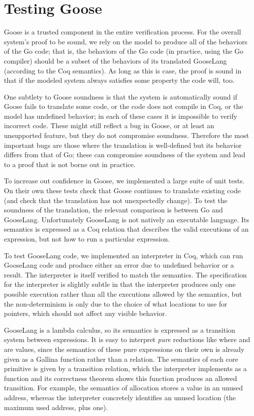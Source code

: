 \section{Testing Goose}%
\label{sec:goose:testing}

Goose is a trusted component in the entire verification process. For the
overall system's proof to be sound, we rely on the model to produce all
of the behaviors of the Go code; that is, the behaviors of the Go code
(in practice, using the Go compiler) should be a subset of the behaviors
of its translated GooseLang (according to the Coq semantics). As long as
this is case, the proof is sound in that if the modeled system always
satisfies some property the code will, too.

One subtlety to Goose soundness is that the system is automatically sound if
Goose fails to translate some code, or the code does not compile in Coq, or the
model has undefined behavior; in each of these cases it is impossible to verify
incorrect code. These might still reflect a bug in Goose, or at least an
unsupported feature, but they do not compromise soundness. Therefore the
most important bugs are those where the translation is well-defined but its behavior differs
from that of Go; these can compromise soundness of the system and lead
to a proof that is not borne out in practice.

To increase out confidence in Goose, we implemented a large suite of
unit tests. On their own these tests check that Goose continues to translate
existing code (and check that the translation has not unexpectedly
change). To test the soundness of the translation, the relevant comparison is
between Go and GooseLang. Unfortunately GooseLang is not natively an executable language.
Its semantics is expressed as a Coq relation that describes the valid executions
of an expression, but not how to run a particular expression.

To test GooseLang code, we implemented an interpreter in Coq, which can
run GooseLang code and produce either an error due to undefined behavior
or a result. The interpreter is itself
verified to match the semantics. The specification for the interpreter is slightly
subtle in that the interpreter produces only one possible execution rather than
all the executions allowed by the semantics, but
the non-determinism is only due to the choice of what locations to use
for pointers, which should not affect any visible behavior.

GooseLang is a lambda calculus, so
its semantics is expressed as a transition system between expressions.
It is easy to
interpret \emph{pure} reductions like  where 
and  are values, since the semantics of these pure expressions on their own
is already given as a Gallina function rather than a relation. The semantics of each core primitive is
given by a transition relation, which the interpreter implements as a function
and its correctness theorem shows this function produces an allowed transition.
For example, the semantics of allocation stores a value in an unused address,
whereas the interpreter concretely identifies an unused location (the maximum
used address, plus one).

